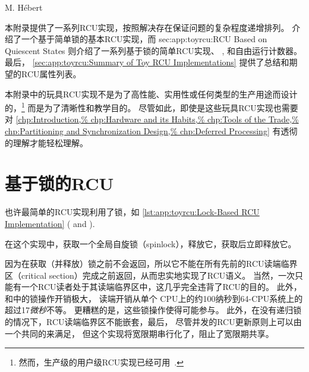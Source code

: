 
%
	 {M. H\'ebert}

本附录提供了一系列RCU实现，按照解决存在保证问题的复杂程度递增排列。
 介绍了一个基于简单锁的基本RCU实现，而
{sec:app:toyrcu:RCU Based on Quiescent States}
则介绍了一系列基于锁的简单RCU实现、
,
和自由运行计数器。
最后， \cref{sec:app:toyrcu:Summary of Toy RCU Implementations}
提供了总结和期望的RCU属性列表。

本附录中的玩具RCU实现不是为了高性能、实用性或任何类型的生产用途而设计的，\footnote{
	然而，生产级的用户级RCU实现已经可用~\cite{MathieuDesnoyers2009URCU,MathieuDesnoyers2012URCU}.}
而是为了清晰性和教学目的。
尽管如此，即使是这些玩具RCU实现也需要对
\cref{chp:Introduction,%
chp:Hardware and its Habits,%
chp:Tools of the Trade,%
chp:Partitioning and Synchronization Design,%
chp:Deferred Processing}
有透彻的理解才能轻松理解。

\section{基于锁的RCU}
\label{sec:app:toyrcu:Lock-Based RCU}

也许最简单的RCU实现利用了锁，如
\cref{lst:app:toyrcu:Lock-Based RCU Implementation}
( and ).

\begin{listing}
\vspace*{-11pt}
\caption{基于锁的RCU实现}
\label{lst:app:toyrcu:Lock-Based RCU Implementation}
\end{listing}

在这个实现中，获取一个全局自旋锁（spinlock），释放它，获取后立即释放它。

因为在获取（并释放）锁之前不会返回，所以它不能在所有先前的RCU读端临界区（critical section）完成之前返回，从而忠实地实现了RCU语义。
当然，一次只能有一个RCU读者处于其读端临界区中，这几乎完全违背了RCU的目的\@。
此外，和中的锁操作开销极大，
读端开销从单个 CPU上的约100纳秒到64-CPU系统上的超过17\emph{微秒}不等。
更糟糕的是，这些锁操作使得可能参与。
此外，在没有递归锁的情况下，RCU读端临界区不能嵌套，最后，
尽管并发的RCU更新原则上可以由一个共同的来满足，
但这个实现将宽限期串行化了，阻止了宽限期共享。

